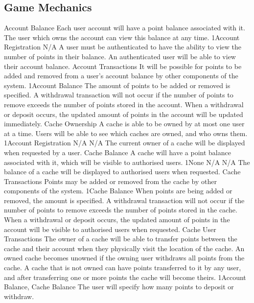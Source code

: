 	\subsection{Game Mechanics}
		\funcreq
			{Account Balance}
			{Each user account will have a point balance associated with it. The user which owns the account can view this balance at any time.}
			{1}{Account Registration}
			{N/A}
			{A user must be authenticated to have the ability to view the number of points in their balance.}
			{An authenticated user will be able to view their account balance.}
		\funcreq
			{Account Transactions}
			{It will be possible for points to be added and removed from a user's account balance by other components of the system.}
			{1}{Account Balance}
			{The amount of points to be added or removed is specified.}
			{A withdrawal transaction will not occur if the number of points to remove exceeds the number of points stored in the account.}
			{When a withdrawal or deposit occurs, the updated amount of points in the account will be updated immediately.}
		\funcreq
			{Cache Ownership}
			{A cache is able to be owned by at most one user at a time. Users will be able to see which caches are owned, and who owns them.}
			{1}{Account Registration}
			{N/A}
			{N/A}
			{The current owner of a cache will be displayed when requested by a user.}
		\funcreq
			{Cache Balance}
			{A cache will have a point balance associated with it, which will be visible to authorised users.}
			{1}{None}
			{N/A}
			{N/A}
			{The balance of a cache will be displayed to authorised users when requested.}
		\funcreq
			{Cache Transactions}
			{Points may be added or removed from the cache by other components of the system.}
			{1}{Cache Balance}
			{When points are being added or removed, the amount is specified.}
			{A withdrawal transaction will not occur if the number of points to remove exceeds the number of points stored in the cache.}
			{When a withdrawal or deposit occurs, the updated amount of points in the account will be visible to authorised users when requested.}
		\funcreq
			{Cache User Transactions}
			{The owner of a cache will be able to transfer points between the cache and their account when they physically visit the location of the cache. An owned cache becomes unowned if the owning user withdraws all points from the cache. A cache that is not owned can have points transferred to it by any user, and after transferring one or more points the cache will become theirs.}
			{1}{Account Balance, Cache Balance}
			{The user will specify how many points to deposit or withdraw.}
